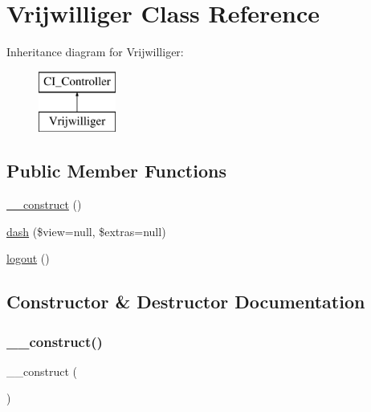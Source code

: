 \hypertarget{class_vrijwilliger}{}\section{Vrijwilliger Class Reference}
\label{class_vrijwilliger}
Inheritance diagram for Vrijwilliger\+:\begin{figure}[H]
\begin{center}
\leavevmode
\includegraphics[height=2.000000cm]{class_vrijwilliger}
\end{center}
\end{figure}
\subsection*{Public Member Functions}
\begin{DoxyCompactItemize}
\item 
\mbox{\hyperlink{class_vrijwilliger_a095c5d389db211932136b53f25f39685}{\+\_\+\+\_\+construct}} ()
\item 
\mbox{\hyperlink{class_vrijwilliger_a35f5125b52883ea70807c42282f60b54}{dash}} (\$view=null, \$extras=null)
\item 
\mbox{\hyperlink{class_vrijwilliger_a082405d89acd6835c3a7c7a08a7adbab}{logout}} ()
\end{DoxyCompactItemize}


\subsection{Constructor \& Destructor Documentation}
\mbox{\label{class_vrijwilliger_a095c5d389db211932136b53f25f39685}} 
\subsubsection{\texorpdfstring{\+\_\+\+\_\+construct()}{\_\_construct()}}
{\footnotesize\ttfamily \+\_\+\+\_\+construct (\begin{DoxyParamCaption}{ }\end{DoxyParamCaption})}

